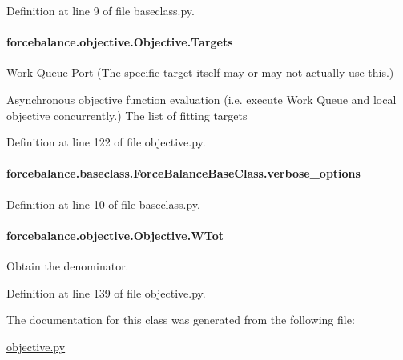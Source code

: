 Definition at line 9 of file baseclass.\-py.

\hypertarget{classforcebalance_1_1objective_1_1Objective_a20e0d09fb2b889b5f604e75a020601a8}{
\paragraph[{Targets}]{\setlength{\rightskip}{0pt plus 5cm}forcebalance.\-objective.\-Objective.\-Targets}}\label{classforcebalance_1_1objective_1_1Objective_a20e0d09fb2b889b5f604e75a020601a8}


Work Queue Port (The specific target itself may or may not actually use this.) 

Asynchronous objective function evaluation (i.\-e. execute Work Queue and local objective concurrently.) The list of fitting targets 

Definition at line 122 of file objective.\-py.

\hypertarget{classforcebalance_1_1baseclass_1_1ForceBalanceBaseClass_a8088e1e20cbd6bc175fb9c9fe9fa0f18}{
\paragraph[{verbose\-\_\-options}]{\setlength{\rightskip}{0pt plus 5cm}forcebalance.\-baseclass.\-Force\-Balance\-Base\-Class.\-verbose\-\_\-options\hspace{0.3cm}{\ttfamily [inherited]}}}\label{classforcebalance_1_1baseclass_1_1ForceBalanceBaseClass_a8088e1e20cbd6bc175fb9c9fe9fa0f18}


Definition at line 10 of file baseclass.\-py.

\hypertarget{classforcebalance_1_1objective_1_1Objective_a1ea300bb1db142dfdf43621454e8c589}{
\paragraph[{W\-Tot}]{\setlength{\rightskip}{0pt plus 5cm}forcebalance.\-objective.\-Objective.\-W\-Tot}}\label{classforcebalance_1_1objective_1_1Objective_a1ea300bb1db142dfdf43621454e8c589}


Obtain the denominator. 



Definition at line 139 of file objective.\-py.



The documentation for this class was generated from the following file\-:\begin{DoxyCompactItemize}
\item 
\hyperlink{objective_8py}{objective.\-py}\end{DoxyCompactItemize}
